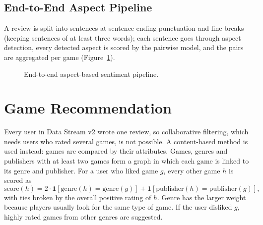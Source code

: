 \subsection{End-to-End Aspect Pipeline}

A review is split into sentences at sentence-ending punctuation and line breaks (keeping sentences of at least three words); each sentence goes through aspect detection, every detected aspect is scored by the pairwise model, and the pairs are aggregated per game (Figure~\ref{fig:absapipe}).

\begin{figure}[!htbp]
\centering
{}
\caption{End-to-end aspect-based sentiment pipeline.}
\label{fig:absapipe}
\end{figure}

\section{Game Recommendation}

Every user in Data Stream v2 wrote one review, so collaborative filtering, which needs users who rated several games, is not possible. A content-based method is used instead: games are compared by their attributes. Games, genres and publishers with at least two games form a graph in which each game is linked to its genre and publisher. For a user who liked game $g$, every other game $h$ is scored as
\begin{equation}
    \text{score}(h) = 2 \cdot \mathbf{1}[\text{genre}(h) = \text{genre}(g)] + \mathbf{1}[\text{publisher}(h) = \text{publisher}(g)],
\end{equation}
with ties broken by the overall positive rating of $h$. Genre has the larger weight because players usually look for the same type of game. If the user disliked $g$, highly rated games from other genres are suggested.

